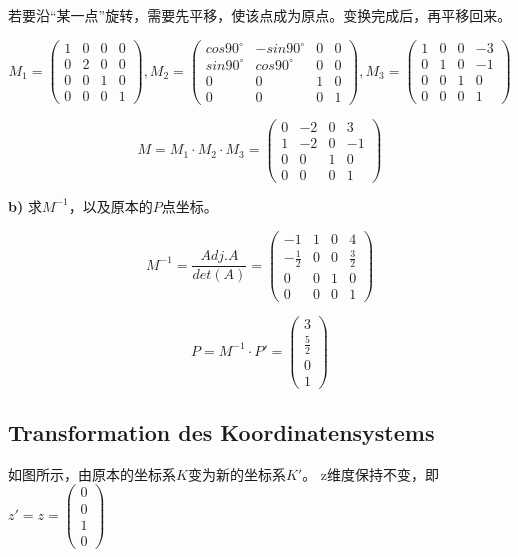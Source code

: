 \documentclass[fleqn]{article}
\begin{document}
若要沿“某一点”旋转，需要先平移，使该点成为原点。变换完成后，再平移回来。

$$M_1 = \begin{pmatrix} 1 & 0 & 0 & 0 \\ 0 &2&0&0\\ 0&0&1&0 \\ 0&0&0&1 \end{pmatrix}, M_2 = \begin{pmatrix} cos90^{\circ} & -sin90^{\circ} & 0 & 0 \\ sin90^{\circ} &cos90^{\circ}&0&0\\ 0&0&1&0 \\ 0&0&0&1 \end{pmatrix}, M_3 = \begin{pmatrix} 1 & 0 & 0 & -3 \\ 0 &1&0&-1\\ 0&0&1&0 \\ 0&0&0&1 \end{pmatrix}$$

$$M = M_1 \cdot M_2 \cdot M_3 = \begin{pmatrix} 0 & -2 & 0 & 3 \\ 1 &-2&0&-1\\ 0&0&1&0 \\ 0&0&0&1 \end{pmatrix}$$

\noindent\textbf{b)} 求$M^{-1}$，以及原本的$P$点坐标。

$$M^{-1} = \frac{Adj.A}{det(A)} = \begin{pmatrix} -1 & 1 & 0 & 4 \\ -\frac{1}{2} &0&0&\frac{3}{2}\\ 0&0&1&0 \\ 0&0&0&1 \end{pmatrix}$$ 

$$P = M^{-1}\cdot P' = \begin{pmatrix} 3 \\ \frac{5}{2} \\ 0 \\ 1 \end{pmatrix}$$

\subsection{Transformation des Koordinatensystems}

如图所示，由原本的坐标系$K$变为新的坐标系$K'$。 z维度保持不变，即$z'=z=\begin{pmatrix} 0\\0\\1\\0\end{pmatrix}$
\end{document}
